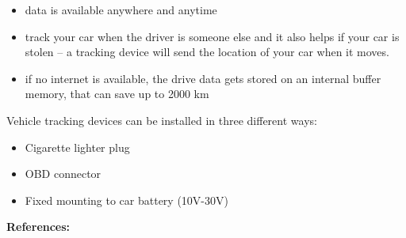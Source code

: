 \begin{singlespace}
\begin{itemize}
\item data is available anywhere and anytime
\item track your car when the driver is someone else and it also helps if your car is stolen – a tracking device will send the location of your car when it moves.
\item if no internet is available, the drive data gets stored on an internal buffer memory, that can save up to 2000 km
\end{itemize}
Vehicle tracking devices can be installed in three different ways:
\begin{itemize}
\item Cigarette lighter plug
\item OBD connector
\item Fixed mounting to car battery (10V-30V)
\end{itemize}
\textbf{References:} \cite{Maxtech}
\newpage


\end{singlespace}
